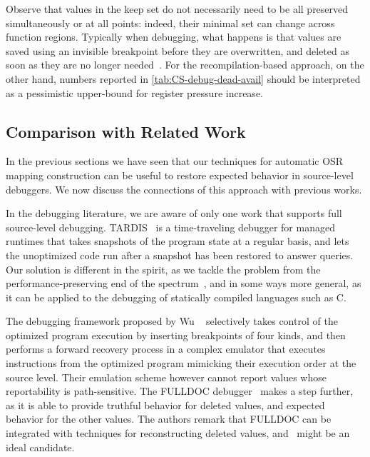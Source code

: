 Observe that values in the keep set do not necessarily need to be all preserved simultaneously or at all points: indeed, their minimal set can change across function regions. Typically when debugging, what happens is that values are saved using an invisible breakpoint before they are overwritten, and deleted as soon as they are no longer needed~\cite{Jaramillo00}. For the recompilation-based approach, on the other hand, numbers reported in \mytable\ref{tab:CS-debug-dead-avail} should be interpreted as a pessimistic upper-bound for register pressure increase.

\subsection{Comparison with Related Work}
In the previous sections we have seen that our techniques for automatic OSR mapping construction can be useful to restore expected behavior in source-level debuggers. We now discuss the connections of this approach with previous works.

In the debugging literature, we are aware of only one work that supports full source-level debugging. TARDIS~\cite{Barr14} is a time-traveling debugger for managed runtimes that takes snapshots of the program state at a regular basis, and lets the unoptimized code run after a snapshot has been restored to answer queries. Our solution is different in the spirit, as we tackle the problem from the performance-preserving end of the spectrum~\cite{Adl-Tabatabai96thesis}, and in some ways more general, as it can be applied to the debugging of statically compiled languages such as C.

The debugging framework proposed by Wu \etal~\cite{Wu99} selectively takes control of the optimized program execution by inserting breakpoints of four kinds, and then performs a forward recovery process in a complex emulator that executes instructions from the optimized program mimicking their execution order at the source level. Their emulation scheme however cannot report values whose reportability is path-sensitive. The FULLDOC debugger~\cite{Jaramillo00} makes a step further, as it is able to provide truthful behavior for deleted values, and expected behavior for the other values. The authors remark that FULLDOC can be integrated with techniques for reconstructing deleted values, and \buildcomp\ might be an ideal candidate.

